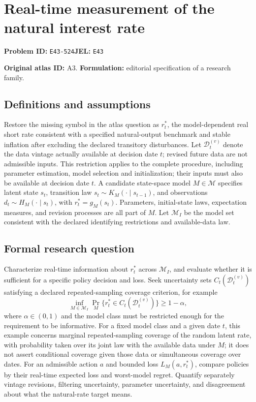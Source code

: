 \documentclass[11pt,a4paper]{article}
\begin{document}
\section*{Real-time measurement of the natural interest rate}
\textbf{Problem ID:} \texttt{E43-524}\quad \textbf{JEL:} \texttt{E43}\par
\label{problem:OP-0013}
\label{atlas:prob:A3}

\noindent\textbf{Original atlas ID:} A3. \textbf{Formulation:} editorial specification of a research family.

\subsection*{Definitions and assumptions}

Restore the missing symbol in the atlas question as $r_t^*$, the model-dependent real short rate consistent with a specified natural-output benchmark and stable inflation after excluding the declared transitory disturbances. Let $\mathcal D_t^{(v)}$ denote the data vintage actually available at decision date $t$; revised future data are not admissible inputs. This restriction applies to the complete procedure, including parameter estimation, model selection and initialization; their inputs must also be available at decision date $t$. A candidate state-space model $M\in\mathcal M$ specifies latent state $s_t$, transition law $s_t\sim K_M(\cdot\mid s_{t-1})$, and observations $d_t\sim H_M(\cdot\mid s_t)$, with $r_t^*=g_M(s_t)$. Parameters, initial-state laws, expectation measures, and revision processes are all part of $M$. Let $\mathcal M_I$ be the model set consistent with the declared identifying restrictions and available-data law.

\subsection*{Formal research question}

Characterize real-time information about $r_t^*$ across $\mathcal M_I$, and evaluate whether it is sufficient for a specific policy decision and loss. Seek uncertainty sets $C_t(\mathcal D_t^{(v)})$ satisfying a declared repeated-sampling coverage criterion, for example
\[
\inf_{M\in\mathcal M_I}\Pr_M\{r_t^*\in C_t(\mathcal D_t^{(v)})\}\ge1-\alpha,
\]
where $\alpha\in(0,1)$ and the model class must be restricted enough for the requirement to be informative. For a fixed model class and a given date $t$, this example concerns marginal repeated-sampling coverage of the random latent rate, with probability taken over its joint law with the available data under $M$; it does not assert conditional coverage given those data or simultaneous coverage over dates. For an admissible action $a$ and bounded loss $L_M(a,r_t^*)$, compare policies by their real-time expected loss and worst-model regret. Quantify separately vintage revisions, filtering uncertainty, parameter uncertainty, and disagreement about what the natural-rate target means.
\end{document}
